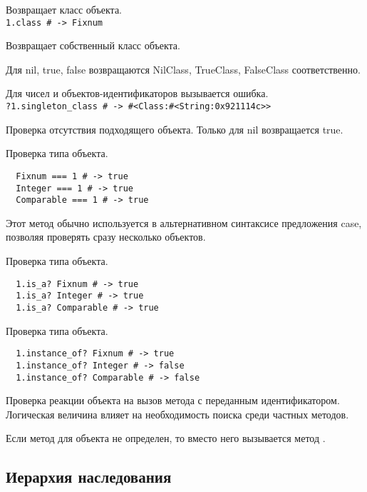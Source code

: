 \begin{methodlist}
  Возвращает класс объекта. 
  \\\verb!1.class # -> Fixnum!
 
  Возвращает собственный класс объекта.

  Для nil, true, false возвращаются NilClass, TrueClass, FalseClass соответственно. 

  Для чисел и объектов-идентификаторов вызывается ошибка. 
  \\\verb!?1.singleton_class # -> #<Class:#<String:0x921114c>>!

  Проверка отсутствия подходящего объекта. Только для nil возвращается true.

  Проверка типа объекта.
  \begin{verbatim}
  Fixnum === 1 # -> true 
  Integer === 1 # -> true 
  Comparable === 1 # -> true
  \end{verbatim}
  Этот метод обычно используется в альтернативном синтаксисе предложения case, позволяя проверять сразу несколько объектов.

  Проверка типа объекта.
  \begin{verbatim}
  1.is_a? Fixnum # -> true 
  1.is_a? Integer # -> true 
  1.is_a? Comparable # -> true
  \end{verbatim}  

  Проверка типа объекта. 
  \begin{verbatim}
  1.instance_of? Fixnum # -> true 
  1.instance_of? Integer # -> false
  1.instance_of? Comparable # -> false
  \end{verbatim}

  Проверка реакции объекта на вызов метода с переданным идентификатором. Логическая величина влияет на необходимость поиска среди частных методов.

  Если метод для объекта не определен, то вместо него вызывается метод . 
\end{methodlist}

\subsection{Иерархия наследования}

